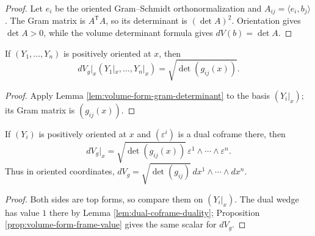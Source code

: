 \begin{proof}
\leanok
{}
\sketch Let $e_i$ be the oriented Gram--Schmidt orthonormalization and $A_{ij}=\langle e_i,b_j\rangle$. The Gram matrix is $A^{\mathsf T}A$, so its determinant is $(\det A)^2$. Orientation gives $\det A>0$, while the volume determinant formula gives $dV(b)=\det A$.
\end{proof}

\begin{proposition}
\label{prop:volume-form-frame-value}
\leanok
{}
If $(Y_1,\ldots,Y_n)$ is positively oriented at $x$, then
\[
dV_g|_x(Y_1|_x,\ldots,Y_n|_x)=\sqrt{\det(g_{ij}(x))}.
\]
\end{proposition}

\begin{proof}
\leanok
{}
\sketch Apply Lemma \ref{lem:volume-form-gram-determinant} to the basis $(Y_i|_x)$; its Gram matrix is $(g_{ij}(x))$.
\end{proof}

\begin{proposition}
\label{prop:volume-form-coordinate-formula}
\leanok
{}
If $(Y_i)$ is positively oriented at $x$ and $(\varepsilon^i)$ is a dual coframe there, then
\[
dV_g|_x=\sqrt{\det(g_{ij}(x))}\,\varepsilon^1\wedge\cdots\wedge\varepsilon^n.
\]
Thus in oriented coordinates, $dV_g=\sqrt{\det(g_{ij})}\,dx^1\wedge\cdots\wedge dx^n$.
\end{proposition}

\begin{proof}
\leanok
{}
\sketch Both sides are top forms, so compare them on $(Y_i|_x)$. The dual wedge has value $1$ there by Lemma \ref{lem:dual-coframe-duality}; Proposition \ref{prop:volume-form-frame-value} gives the same scalar for $dV_g$.
\end{proof}

